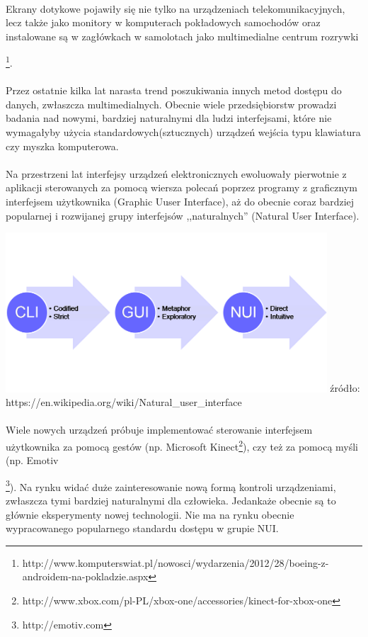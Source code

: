 \paragraph{}
Ekrany dotykowe pojawiły się nie tylko na urządzeniach telekomunikacyjnych, lecz także jako monitory w komputerach pokładowych samochodów oraz instalowane są w zagłówkach w samolotach jako multimedialne centrum rozrywki {\footnote{http://www.komputerswiat.pl/nowosci/wydarzenia/2012/28/boeing-z-androidem-na-pokladzie.aspx}.
\paragraph{}
Przez ostatnie kilka lat narasta trend poszukiwania innych metod dostępu do danych, zwłaszcza multimedialnych. Obecnie wiele przedsiębiorstw prowadzi badania nad nowymi, bardziej naturalnymi dla ludzi interfejsami, które nie wymagałyby użycia standardowych(sztucznych) urządzeń wejścia typu klawiatura czy myszka komputerowa.
\paragraph{}
Na przestrzeni lat interfejsy urządzeń elektronicznych ewoluowały pierwotnie z aplikacji sterowanych za pomocą wiersza polecań poprzez programy z graficznym interfejsem użytkownika (Graphic Uuser Interface), aż do obecnie coraz bardziej popularnej i rozwijanej grupy interfejsów ,,naturalnych'' (Natural User Interface).
\begin{center}
\includegraphics[width=0.9\textwidth]{images/nui.png}
\small {źródło: https://en.wikipedia.org/wiki/Natural\_user\_interface }
\end{center}
\paragraph{}
Wiele nowych urządzeń próbuje implementować sterowanie interfejsem użytkownika za pomocą gestów (np. Microsoft Kinect\footnote{http://www.xbox.com/pl-PL/xbox-one/accessories/kinect-for-xbox-one}), czy też za pomocą myśli (np. Emotiv{\footnote{http://emotiv.com}). Na rynku widać duże zainteresowanie nową formą kontroli urządzeniami, zwłaszcza tymi bardziej naturalnymi dla człowieka. Jedankaże obecnie są to głównie eksperymenty nowej technologii. Nie ma na rynku obecnie wypracowanego popularnego standardu dostępu w grupie NUI.

}}
